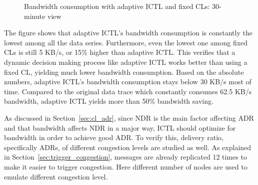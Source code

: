 \documentclass[12pt]{report}
\begin{document}
\begin{figure}[h]
  \caption{\label{fig:adaptive_bandwidth}Bandwidth consumption with adaptive ICTL and fixed CLs: 30-minute view}
\end{figure}

The figure shows that adaptive ICTL's bandwidth consumption is constantly the lowest among all the data series. Furthermore, even the lowest one among fixed CLs is still 5 KB/s, or 15\% higher than adaptive ICTL. This verifies that a dynamic decision making process like adaptive ICTL works better than using a fixed CL, yielding much lower bandwidth consumption. Based on the absolute numbers, adaptive ICTL's bandwidth consumption stays below 30 KB/s most of time. Compared to the original data trace which constantly consumes 62.5 KB/s bandwidth, adaptive ICTL yields more than 50\% bandwidth saving.

As discussed in Section~\ref{sec:cl_adr}, since NDR is the main factor affecting ADR and that bandwidth affects NDR in a major way, ICTL should optimize for bandwidth in order to achieve good ADR. To verify this, delivery ratio, specifically ADRs, of different congestion levels are studied as well. As explained in Section~\ref{sec:trigger_congestion}, messages are already replicated 12 times to make it easier to trigger congestion. Here different number of nodes are used to emulate different congestion level.
\end{document}
